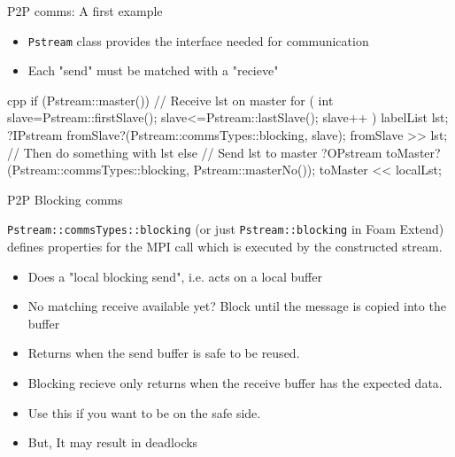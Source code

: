 \begin{frame}[fragile]{P2P comms: A first example}

    \begin{itemize}
        \item {\tt Pstream} class provides the interface needed for communication
        \item Each "send" must be matched with a "recieve"
    \end{itemize}
\begin{CodeEnvNoComment}{cpp}{\tiny}
if (Pstream::master())
{
    // Receive lst on master
    for
    (
        int slave=Pstream::firstSlave();
        slave<=Pstream::lastSlave();
        slave++
    )
    {
        labelList lst;
        ?\colorbox{mLightGreen!20}{IPstream fromSlave}?(Pstream::commsTypes::blocking, slave);
        fromSlave >> lst; // Then do something with lst
    }
} else {
    // Send lst to master
    ?\colorbox{mLightGreen!20}{OPstream toMaster}?(Pstream::commsTypes::blocking, Pstream::masterNo());
    toMaster << localLst;
}
\end{CodeEnvNoComment}
\end{frame}

\begin{frame}[fragile]{P2P Blocking comms}

    {\tt Pstream::commsTypes::blocking} (or just {\tt Pstream::blocking} in Foam Extend) defines properties for the MPI call which is executed by
    the constructed stream.
    \begin{itemize}
        \item Does a "local blocking send", i.e. acts on a local buffer
        \item No matching receive available yet? Block until the message is copied into the buffer
        \item Returns when the send buffer is safe to be reused.
        \item Blocking recieve only returns when the receive buffer has the expected data.
        \item Use this if you want to be on the safe side.
        \item But, It may result in deadlocks
    \end{itemize}
\end{frame}

